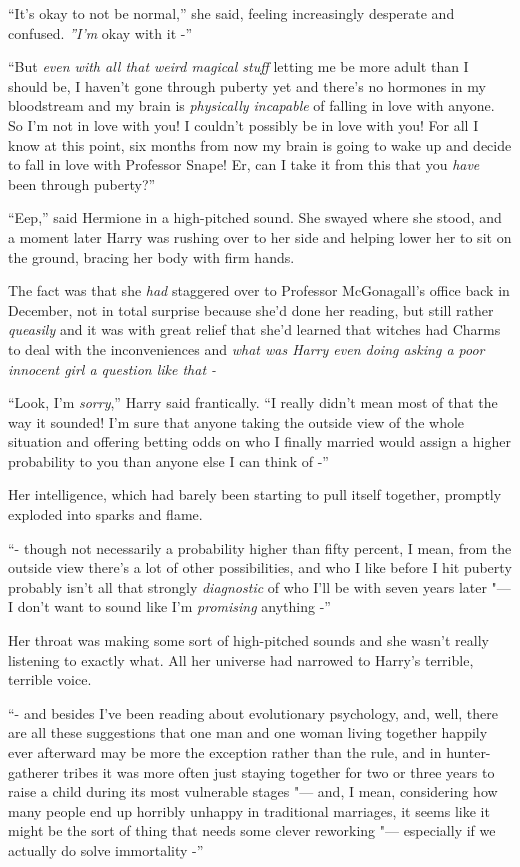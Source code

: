 ``It's okay to not be normal,'' she said, feeling increasingly desperate
and confused. \emph{''I'm} okay with it -''

``But \emph{even with all that weird magical stuff} letting me be more
adult than I should be, I haven't gone through puberty yet and there's
no hormones in my bloodstream and my brain is \emph{physically
incapable} of falling in love with anyone. So I'm not in love with you!
I couldn't possibly be in love with you! For all I know at this point,
six months from now my brain is going to wake up and decide to fall in
love with Professor Snape! Er, can I take it from this that you
\emph{have} been through puberty?''

``Eep,'' said Hermione in a high-pitched sound. She swayed where she
stood, and a moment later Harry was rushing over to her side and helping
lower her to sit on the ground, bracing her body with firm hands.

The fact was that she \emph{had} staggered over to Professor
McGonagall's office back in December, not in total surprise because
she'd done her reading, but still rather \emph{queasily} and it was with
great relief that she'd learned that witches had Charms to deal with the
inconveniences and \emph{what was Harry even doing asking a poor
innocent girl a question like that -}

``Look, I'm \emph{sorry},'' Harry said frantically. ``I really didn't
mean most of that the way it sounded! I'm sure that anyone taking the
outside view of the whole situation and offering betting odds on who I
finally married would assign a higher probability to you than anyone
else I can think of -''

Her intelligence, which had barely been starting to pull itself
together, promptly exploded into sparks and flame.

``- though not necessarily a probability higher than fifty percent, I
mean, from the outside view there's a lot of other possibilities, and
who I like before I hit puberty probably isn't all that strongly
\emph{diagnostic} of who I'll be with seven years later "--- I don't want
to sound like I'm \emph{promising} anything -''

Her throat was making some sort of high-pitched sounds and she wasn't
really listening to exactly what. All her universe had narrowed to
Harry's terrible, terrible voice.

``- and besides I've been reading about evolutionary psychology, and,
well, there are all these suggestions that one man and one woman living
together happily ever afterward may be more the exception rather than
the rule, and in hunter-gatherer tribes it was more often just staying
together for two or three years to raise a child during its most
vulnerable stages "--- and, I mean, considering how many people end up
horribly unhappy in traditional marriages, it seems like it might be the
sort of thing that needs some clever reworking "--- especially if we
actually do solve immortality -''

